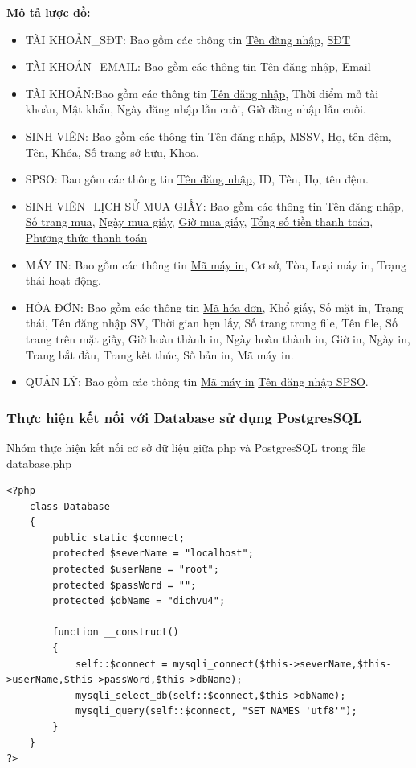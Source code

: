 \documentclass[a4paper]{article}
\begin{document}
\noindent \textbf{Mô tả lược đồ:}
\begin{itemize}
    \item TÀI KHOẢN\_SĐT: Bao gồm các thông tin \underline{Tên đăng nhập}, \underline{SĐT}
    \item TÀI KHOẢN\_EMAIL: Bao gồm các thông tin \underline{Tên đăng nhập}, \underline{Email}
    \item TÀI KHOẢN:Bao gồm các thông tin \underline{Tên đăng nhập}, Thời điểm mở tài khoản, Mật khẩu, Ngày đăng nhập lần cuối, Giờ đăng nhập lần cuối.
    \item SINH VIÊN: Bao gồm các thông tin \underline{Tên đăng nhập}, MSSV, Họ, tên đệm, Tên, Khóa, Số trang sở hữu, Khoa.
    \item SPSO: Bao gồm các thông tin \underline{Tên đăng nhập}, ID, Tên, Họ, tên đệm.
    \item SINH VIÊN\_LỊCH SỬ MUA GIẤY: Bao gồm các thông tin \underline{Tên đăng nhập, Số trang mua}, \underline{Ngày mua giấy}, \underline{Giờ mua giấy}, \underline{Tổng số tiền thanh toán}, \underline{Phương thức thanh toán}
    \item MÁY IN: Bao gồm các thông tin \underline{Mã máy in}, Cơ sở, Tòa, Loại máy in, Trạng thái hoạt động.
    \item HÓA ĐƠN: Bao gồm các thông tin \underline{Mã hóa đơn}, Khổ giấy, Số mặt in, Trạng thái, Tên đăng nhập SV, Thời gian hẹn lấy, Số trang trong file, Tên file, Số trang trên mặt giấy, Giờ hoàn thành in, Ngày hoàn thành in, Giờ in, Ngày in, Trang bắt đầu, Trang kết thúc, Số bản in, Mã máy in.
    \item QUẢN LÝ: Bao gồm các thông tin \underline{Mã máy in} \underline{Tên đăng nhập SPSO}.
    
\end{itemize}

\subsubsection{Thực hiện kết nối với Database sử dụng PostgresSQL}

\noindent Nhóm thực hiện kết nối cơ sở dữ liệu giữa php và PostgresSQL trong file database.php
\begin{lstlisting}
<?php
    class Database
    {
        public static $connect;
        protected $severName = "localhost";
        protected $userName = "root";
        protected $passWord = "";
        protected $dbName = "dichvu4";

        function __construct()
        {
            self::$connect = mysqli_connect($this->severName,$this->userName,$this->passWord,$this->dbName);
            mysqli_select_db(self::$connect,$this->dbName);
            mysqli_query(self::$connect, "SET NAMES 'utf8'");
        }
    }
?>
\end{lstlisting}
\end{document}
